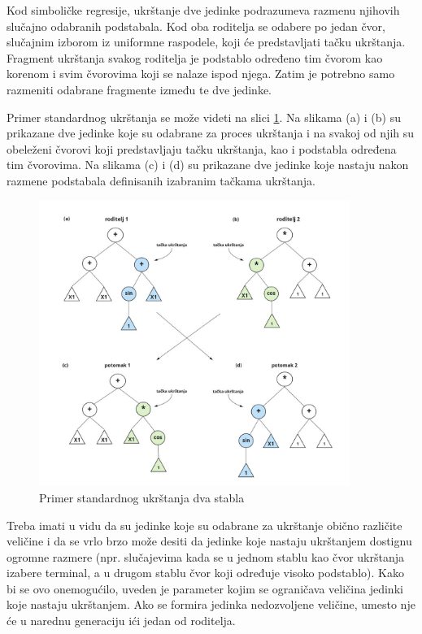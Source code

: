 \documentclass[main.tex]{subfiles}
\begin{document}
Kod simboličke regresije, ukrštanje dve jedinke podrazumeva razmenu njihovih slučajno odabranih podstabala. Kod oba roditelja se odabere po jedan čvor, slučajnim izborom iz uniformne raspodele, koji će predstavljati tačku ukrštanja. Fragment ukrštanja svakog roditelja je podstablo određeno tim čvorom kao korenom i svim čvorovima koji se nalaze ispod njega. Zatim je potrebno samo razmeniti odabrane fragmente između te dve jedinke. 

Primer standardnog ukrštanja se može videti na slici \ref{fig:standardCrossover}.
Na slikama (a) i (b) su prikazane dve jedinke koje su odabrane za proces ukrštanja i na svakoj od njih su obeleženi čvorovi koji predstavljaju tačku ukrštanja, kao i podstabla određena tim čvorovima. Na slikama (c) i (d) su prikazane dve jedinke koje nastaju nakon razmene podstabala definisanih izabranim tačkama ukrštanja.

\begin{figure}[!ht]
\begin{center}
\includegraphics[width=0.9\textwidth]{../images/standard_crossover4.jpg}
\end{center}
\caption{Primer standardnog ukrštanja dva stabla}
\label{fig:standardCrossover}
\end{figure}

Treba imati u vidu da su jedinke koje su odabrane za ukrštanje obično različite veličine i da se vrlo brzo može desiti da jedinke koje nastaju ukrštanjem dostignu ogromne razmere (npr. slučajevima kada se u jednom stablu kao čvor ukrštanja izabere terminal, a u drugom stablu čvor koji određuje visoko podstablo). Kako bi se ovo onemogućilo, uveden je parameter kojim se ograničava veličina jedinki koje nastaju ukrštanjem. Ako se formira jedinka nedozvoljene veličine, umesto nje će u narednu generaciju ići jedan od roditelja.
\end{document}
